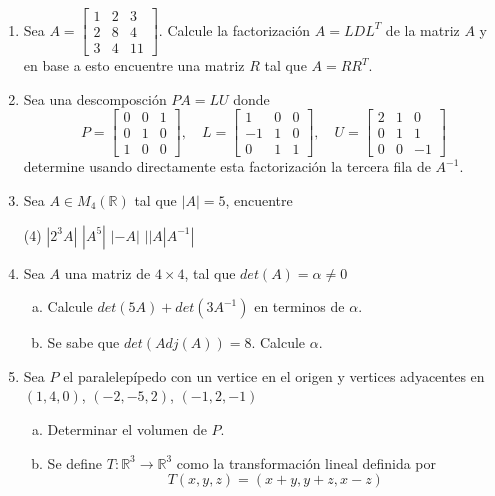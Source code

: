 \documentclass[12pt]{article}
\newenvironment{preguntas}
{\begin{enumerate}\itemsep12pt
	}
	{
	\end{enumerate}
}
\newcommand{\ra}{\rightarrow}
\newcommand{\R}{\mathbb{R}}
\begin{document}
\begin{preguntas}
$$\begin{bmatrix}
	2 & 4 & -1 & 5 & -2 \\
	-4 & -5 & 3 & -8 & 1 \\
	2 & -5 & -4 & 1 & 8 \\
	-6 & 0 & 7 & -3 & 1
	\end{bmatrix}$$
\item Sea $A = \begin{bmatrix}
	1 & 2 & 3\\
	2 & 8 & 4 \\
	3 & 4 & 11\end{bmatrix}$. Calcule la factorización $A=LDL^T$ de la matriz $A$ y en base a esto encuentre una matriz $R$ tal que $A = RR^T$.
\item Sea una descomposción $PA = LU$ donde
	$$P = \begin{bmatrix}
	0 & 0 & 1\\
	0 & 1 & 0\\
	1 & 0 & 0
	\end{bmatrix}, \quad
	L = \begin{bmatrix}
	1 & 0 & 0\\
	-1 & 1 & 0\\
	0 & 1 & 1
	\end{bmatrix}, \quad
	U = \begin{bmatrix}
	2 & 1 & 0\\
	0 & 1 & 1\\
	0 & 0 & -1
	\end{bmatrix}$$
	determine usando directamente esta factorización la tercera fila de $A^{-1}$.
\item Sea $A \in M_4 (\R)$ tal que $|A|=5$, encuentre
\begin{tasks}(4)
\task $|2^3A|$
\task $|A^5|$
\task $|-A|$
\task $||A|A^{-1}|$
\end{tasks}
\item Sea $A$ una matriz de $4\times 4$, tal que $det(A) = \alpha \neq 0$
\begin{enumerate}[a)]
\item Calcule  $det(5A)+det(3A^{-1})$ en terminos de $\alpha$.
\item Se sabe que $det(Adj(A))=8$. Calcule $\alpha$.
\end{enumerate}
\item Sea $P$ el paralelepípedo con un vertice en el origen y vertices adyacentes en $(1,4,0)$, $(-2,-5,2)$, $(-1,2,-1)$
\begin{enumerate}[a)]
\item Determinar el volumen de $P$.
\item Se define $T: \R^3 \ra \R^3$ como la transformación lineal definida por $$T(x,y,z)=(x+y,y+z,x-z)$$

\end{enumerate}
\end{preguntas}
\end{document}
